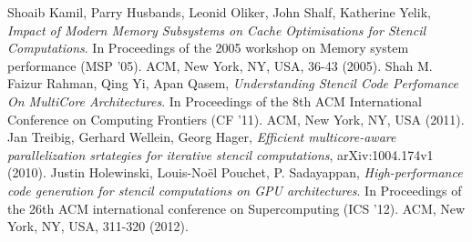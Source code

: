 \documentclass[a4paper,12pt]{article}
\begin{document}
\begin{thebibliography}{1}
   Shoaib Kamil, Parry Husbands, Leonid Oliker, John
  Shalf, Katherine Yelik, {\em Impact of Modern Memory Subsystems on
    Cache Optimisations for Stencil Computations}. In Proceedings of
  the 2005 workshop on Memory system performance (MSP '05). ACM, New
  York, NY, USA, 36-43 (2005).
 Shah M. Faizur Rahman, Qing Yi, Apan Qasem, {\em
    Understanding Stencil Code Perfomance On MultiCore
    Architectures}. In Proceedings of the 8th ACM International
  Conference on Computing Frontiers (CF '11). ACM, New York, NY, USA (2011).
 Jan Treibig, Gerhard Wellein, Georg Hager, {\em
    Efficient multicore-aware parallelization srtategies for iterative
    stencil computations}, arXiv:1004.174v1 (2010).
   Justin Holewinski, Louis-Noël Pouchet,
  P. Sadayappan, {\em High-performance code generation for stencil
  computations on GPU architectures}. In Proceedings of the 26th ACM
  international conference on Supercomputing (ICS '12). ACM, New York,
  NY, USA, 311-320 (2012).
\end{thebibliography}
\end{document}
